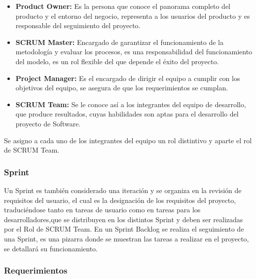 \begin{itemize}
	\item \textbf{Product Owner:} Es la persona que conoce el panorama completo del producto y el entorno del negocio, representa a los usuarios del producto y es responsable del seguimiento del proyecto.
	\item \textbf{SCRUM Master:} Encargado de garantizar el funcionamiento de la metodología y evaluar los procesos, es una responsabilidad del funcionamiento del modelo, es un rol flexible del que depende el éxito del proyecto.
	\item \textbf{Project Manager:} Es el encargado de dirigir el equipo a cumplir con los objetivos del equipo, se asegura de que los requerimientos se cumplan.
	\item \textbf{SCRUM Team:} Se le conoce así a los integrantes del equipo de desarrollo, que produce resultados, cuyas habilidades son aptas para el desarrollo del proyecto de Software.
\end{itemize}

Se asigno a cada uno de los integrantes del equipo un rol distintivo y aparte el rol de SCRUM Team.

\subsubsection{Sprint}

Un Sprint es también considerado una iteración y se organiza en la revisión de requisitos del usuario, el cual es la designación de los requisitos del proyecto, traduciéndose tanto en tareas de usuario como en tareas para los desarrolladores,que se distribuyen en los distintos Sprint y deben ser realizadas por el Rol de SCRUM Team. En un Sprint Backlog se realiza el seguimiento de una Sprint, es una pizarra donde se muestran las tareas a realizar en el proyecto, se detallará su funcionamiento.

\subsubsection{Requerimientos}

